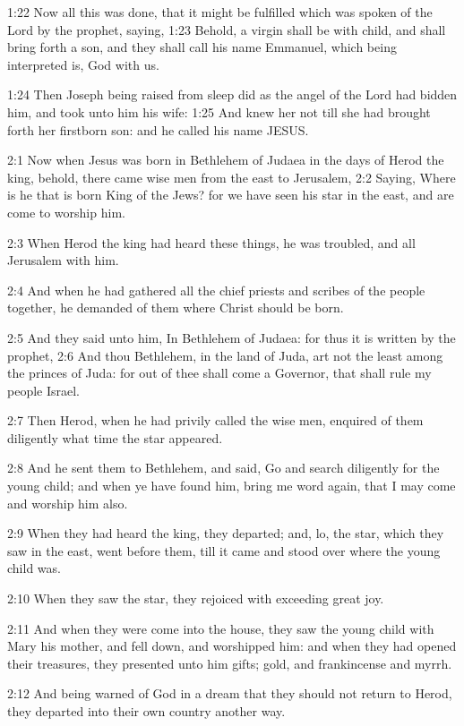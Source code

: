 1:22 Now all this was done, that it might be fulfilled which was
spoken of the Lord by the prophet, saying, 1:23 Behold, a virgin shall
be with child, and shall bring forth a son, and they shall call his
name Emmanuel, which being interpreted is, God with us.

1:24 Then Joseph being raised from sleep did as the angel of the Lord
had bidden him, and took unto him his wife: 1:25 And knew her not till
she had brought forth her firstborn son: and he called his name JESUS.

2:1 Now when Jesus was born in Bethlehem of Judaea in the days of
Herod the king, behold, there came wise men from the east to
Jerusalem, 2:2 Saying, Where is he that is born King of the Jews? for
we have seen his star in the east, and are come to worship him.

2:3 When Herod the king had heard these things, he was troubled, and
all Jerusalem with him.

2:4 And when he had gathered all the chief priests and scribes of the
people together, he demanded of them where Christ should be born.

2:5 And they said unto him, In Bethlehem of Judaea: for thus it is
written by the prophet, 2:6 And thou Bethlehem, in the land of Juda,
art not the least among the princes of Juda: for out of thee shall
come a Governor, that shall rule my people Israel.

2:7 Then Herod, when he had privily called the wise men, enquired of
them diligently what time the star appeared.

2:8 And he sent them to Bethlehem, and said, Go and search diligently
for the young child; and when ye have found him, bring me word again,
that I may come and worship him also.

2:9 When they had heard the king, they departed; and, lo, the star,
which they saw in the east, went before them, till it came and stood
over where the young child was.

2:10 When they saw the star, they rejoiced with exceeding great joy.

2:11 And when they were come into the house, they saw the young child
with Mary his mother, and fell down, and worshipped him: and when they
had opened their treasures, they presented unto him gifts; gold, and
frankincense and myrrh.

2:12 And being warned of God in a dream that they should not return to
Herod, they departed into their own country another way.


